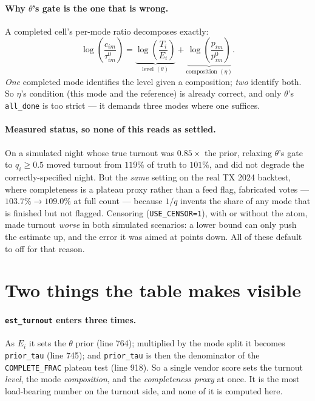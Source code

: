 \documentclass[11pt]{article}
\newcommand{\var}[1]{\texttt{\footnotesize #1}}
\begin{document}
\paragraph{Why $\theta$'s gate is the one that is wrong.}
A completed cell's per-mode ratio decomposes exactly:
\begin{equation*}
  \log\!\left(\frac{c_{im}}{\tau^{0}_{im}}\right)
  = \underbrace{\log\!\left(\frac{T_i}{E_i}\right)}_{\text{level } (\theta)}
  + \underbrace{\log\!\left(\frac{p_{im}}{p^{0}_{im}}\right)}_{\text{composition } (\eta)} .
\end{equation*}
\emph{One} completed mode identifies the level given a composition; \emph{two} identify
both. So $\eta$'s condition (this mode and the reference) is already correct, and only
$\theta$'s \var{all\_done} is too strict --- it demands three modes where one suffices.

\paragraph{Measured status, so none of this reads as settled.}
On a simulated night whose true turnout was $0.85\times$ the prior, relaxing $\theta$'s
gate to $q_i \geq 0.5$ moved turnout from $119\%$ of truth to $101\%$, and did not
degrade the correctly-specified night. But the \emph{same} setting on the real TX 2024
backtest, where completeness is a plateau proxy rather than a feed flag, fabricated votes
--- $103.7\% \rightarrow 109.0\%$ at full count --- because $1/q$ invents the share of any
mode that is finished but not flagged. Censoring (\var{USE\_CENSOR=1}), with or without
the atom, made turnout \emph{worse} in both simulated scenarios: a lower bound can only
push the estimate up, and the error it was aimed at points down. All of these default to
off for that reason.

\section*{Two things the table makes visible}

\paragraph{\var{est\_turnout} enters three times.}
As $E_i$ it sets the $\theta$ prior (line 764); multiplied by the mode split it becomes
\var{prior\_tau} (line 745); and \var{prior\_tau} is then the denominator of the
\var{COMPLETE\_FRAC} plateau test (line 918). So a single vendor score sets the turnout
\emph{level}, the mode \emph{composition}, and the \emph{completeness proxy} at once. It
is the most load-bearing number on the turnout side, and none of it is computed here.
\end{document}
